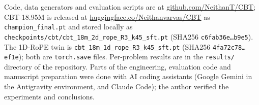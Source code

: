 \documentclass[10pt,twocolumn]{article}
\begin{document}
Code, data generators and evaluation scripts are at \href{https://github.com/NeithanT/CBT}{github.com/NeithanT/CBT}; CBT-18.95M is released at \href{https://huggingface.co/Neithanvarvas/CBT}{huggingface.co/Neithanvarvas/CBT} as \texttt{champion\_final.pt} and stored locally as \texttt{checkpoints/cbt/cbt\_18m\_2d\_rope\_R3\_k45\_sft.pt} (SHA256 \texttt{c6fab36e\ldots b9e5}). The 1D-RoPE twin is \texttt{cbt\_18m\_1d\_rope\_R3\_k45\_sft.pt} (SHA256 \texttt{4fa72c78\ldots ef1e}); both are \texttt{torch.save} files. Per-problem results are in the \texttt{results/} directory of the repository. Parts of the engineering, evaluation code and manuscript preparation were done with AI coding assistants (Google Gemini in the Antigravity environment, and Claude Code); the author verified the experiments and conclusions.



\end{document}
